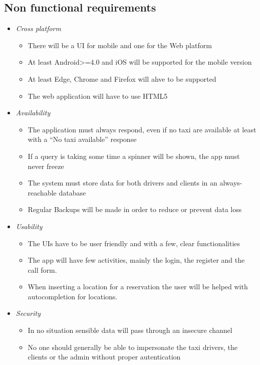 \documentclass{article}
\begin{document}
\subsection{Non functional requirements}
\begin{itemize}
	\item \textit{Cross platform}
		\begin{itemize}
			\item There will be a UI for mobile and one for the Web platform
			\item At least Android>=4.0 and iOS will be supported for the mobile version %
			\item At least Edge, Chrome and Firefox will ahve to be supported
			\item The web application will have to use HTML5
		\end{itemize}
	\item \textit{Availability}
		\begin{itemize}
			\item The application must always respond, even if no taxi are available at least with a ``No taxi available'' response
			\item If a query is taking some time a spinner will be shown, the app must never freeze
			\item The system must store data for both drivers and clients in an always-reachable database
			\item Regular Backups will be made in order to reduce or prevent data loss
		\end{itemize}
	\item \textit{Usability}
		\begin{itemize}
			\item The UIs have to be user friendly and with a few, clear functionalities
			\item The app will have few activities, mainly the login, the register and the call form.
			\item When inserting a location for a reservation the user will be helped with autocompletion for locations.
		\end{itemize}
	\item \textit{Security}
		\begin{itemize}
			\item In no situation sensible data will pass through an insecure channel
			\item No one should generally be able to impersonate the taxi drivers, the clients or the admin without proper autentication
		\end{itemize}
\end{itemize}
\end{document}
